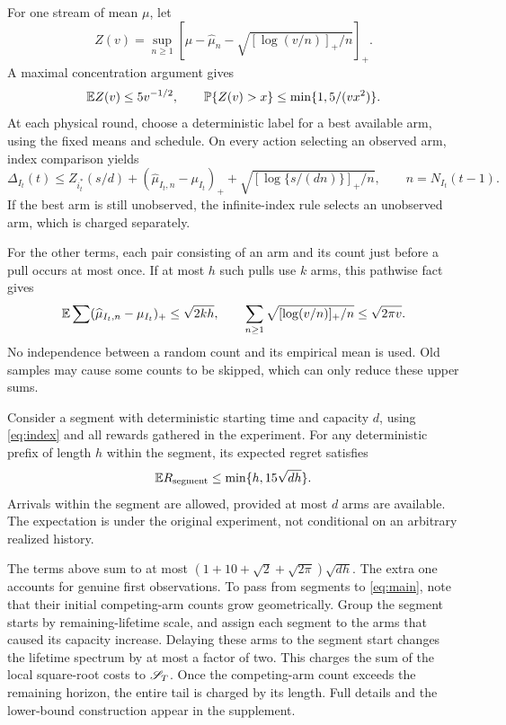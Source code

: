 For one stream of mean $\mu$, let
\begin{equation}\label{eq:underestimate}
 Z(v)=\sup_{n\ge1}\left[\mu-\widehat\mu_n-
 \sqrt{[\log(v/n)]_+/n}\right]_+.
\end{equation}
A maximal concentration argument gives
\begin{equation}\label{eq:Zbounds}
 \mathbb E Z(v)\le5v^{-1/2},\qquad
 \mathbb P\{Z(v)>x\}\le\min\{1,5/(vx^2)\}.
\end{equation}
At each physical round, choose a deterministic label for a best available arm, using the fixed means and schedule. On every action selecting an observed arm, index comparison yields
\begin{equation}\label{eq:index-decomposition}
 \Delta_{I_t}(t)\le Z_{i_t^*}(s/d)
 +(\widehat\mu_{I_t,n}-\mu_{I_t})_+
 +\sqrt{[\log\{s/(dn)\}]_+/n},\qquad n=N_{I_t}(t-1).
\end{equation}
If the best arm is still unobserved, the infinite-index rule selects an unobserved arm, which is charged separately.

For the other terms, each pair consisting of an arm and its count just before a pull occurs at most once. If at most $h$ such pulls use $k$ arms, this pathwise fact gives
\[
 \mathbb E\sum(\widehat\mu_{I_t,n}-\mu_{I_t})_+\le\sqrt{2kh},
 \qquad
 \sum_{n\ge1}\sqrt{[\log(v/n)]_+/n}\le\sqrt{2\pi v}.
\]
No independence between a random count and its empirical mean is used. Old samples may cause some counts to be skipped, which can only reduce these upper sums.

\begin{lemma}\label{lem:kernel}
Consider a segment with deterministic starting time and capacity $d$, using \eqref{eq:index} and all rewards gathered in the experiment. For any deterministic prefix of length $h$ within the segment, its expected regret satisfies
\begin{equation}\label{eq:kernel}
 \mathbb E R_{\mathrm{segment}}\le\min\{h,15\sqrt{dh}\}.
\end{equation}
Arrivals within the segment are allowed, provided at most $d$ arms are available. The expectation is under the original experiment, not conditional on an arbitrary realized history.
\end{lemma}

The terms above sum to at most $(1+10+\sqrt2+\sqrt{2\pi})\sqrt{dh}$. The extra one accounts for genuine first observations. To pass from segments to \eqref{eq:main}, note that their initial competing-arm counts grow geometrically. Group the segment starts by remaining-lifetime scale, and assign each segment to the arms that caused its capacity increase. Delaying these arms to the segment start changes the lifetime spectrum by at most a factor of two. This charges the sum of the local square-root costs to $\mathscr S_T$. Once the competing-arm count exceeds the remaining horizon, the entire tail is charged by its length. Full details and the lower-bound construction appear in the supplement.

